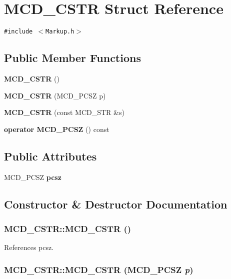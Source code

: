 \section{MCD\_\-CSTR Struct Reference}
\label{structMCD__CSTR}
{\tt \#include $<$Markup.h$>$}

\subsection*{Public Member Functions}
\begin{CompactItemize}
\item 
{\bf MCD\_\-CSTR} ()
\item 
{\bf MCD\_\-CSTR} (MCD\_\-PCSZ p)
\item 
{\bf MCD\_\-CSTR} (const MCD\_\-STR \&s)
\item 
{\bf operator MCD\_\-PCSZ} () const 
\end{CompactItemize}
\subsection*{Public Attributes}
\begin{CompactItemize}
\item 
MCD\_\-PCSZ {\bf pcsz}
\end{CompactItemize}


\subsection{Constructor \& Destructor Documentation}
\subsubsection[MCD\_\-CSTR]{\setlength{\rightskip}{0pt plus 5cm}MCD\_\-CSTR::MCD\_\-CSTR ()\hspace{0.3cm}{\tt  [inline]}}\label{structMCD__CSTR_527942329419b01535431646e136eaa1}




References pcsz.
\subsubsection[MCD\_\-CSTR]{\setlength{\rightskip}{0pt plus 5cm}MCD\_\-CSTR::MCD\_\-CSTR (MCD\_\-PCSZ {\em p})\hspace{0.3cm}{\tt  [inline]}}\label{structMCD__CSTR_f0cb7482427cfab856ee18c8ac50e5fa}




